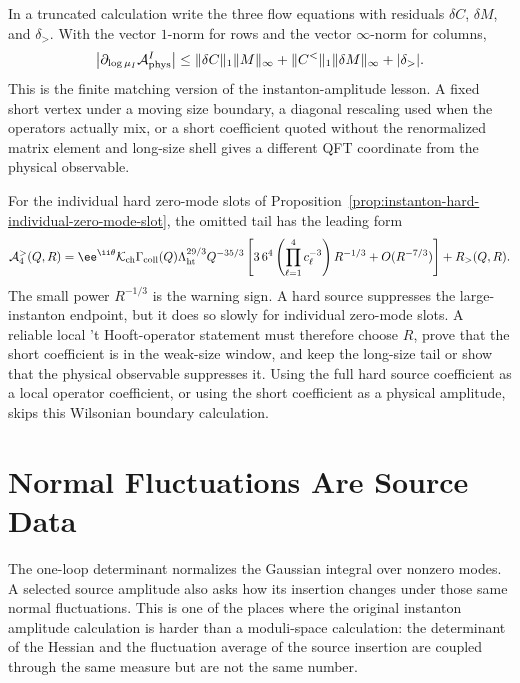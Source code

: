 \begin{controlledapproximation}
In a truncated calculation write the three flow equations with residuals
\(\delta C\), \(\delta M\), and \(\delta_>\).  With the vector \(1\)-norm for
rows and the vector \(\infty\)-norm for columns,
\begin{equation}
  \left|
  \partial_{\log\mu_I}\mathcal A_{\rm phys}^{I}
  \right|
  \le
  \|\delta C\|_1\|M\|_{\infty}
  +
  \|C^{<}\|_1\|\delta M\|_{\infty}
  +
  |\delta_>| .
  \label{eq:instanton-wilsonian-covariance-residual-bound}
\end{equation}
This is the finite matching version of the instanton-amplitude lesson.  A
fixed short vertex under a moving size boundary, a diagonal rescaling used
when the operators actually mix, or a short coefficient quoted without the
renormalized matrix element and long-size shell gives a different QFT
coordinate from the physical observable.
\end{controlledapproximation}

For the individual hard zero-mode slots of
Proposition~\ref{prop:instanton-hard-individual-zero-mode-slot}, the omitted
tail has the leading form
\begin{equation}
  \mathcal A_{4}^{>}(Q,R)
  =
  \ee^{\ii\theta}
  \mathcal K_{\rm ch}
  \Gamma_{\rm coll}(Q)
  \Lambda_{\rm ht}^{29/3}
  Q^{-35/3}
  \left[
    3\,6^4
    \left(\prod_{\ell=1}^{4}c_\ell^{-3}\right)R^{-1/3}
    +O(R^{-7/3})
  \right]
  +R_{>}(Q,R).
  \label{eq:instanton-hard-ope-long-tail}
\end{equation}
The small power \(R^{-1/3}\) is the warning sign.  A hard source suppresses the
large-instanton endpoint, but it does so slowly for individual zero-mode
slots.  A reliable local 't Hooft-operator statement must therefore choose
\(R\), prove that the short coefficient is in the weak-size window, and keep
the long-size tail or show that the physical observable suppresses it.  Using
the full hard source coefficient as a local operator coefficient, or using the
short coefficient as a physical amplitude, skips this Wilsonian boundary
calculation.

\section{Normal Fluctuations Are Source Data}
\label{sec:instanton-normal-fluctuation-source-data}

The one-loop determinant normalizes the Gaussian integral over nonzero modes.
A selected source amplitude also asks how its insertion changes under those
same normal fluctuations.  This is one of the places where the original
instanton amplitude calculation is harder than a moduli-space calculation:
the determinant of the Hessian and the fluctuation average of the source
insertion are coupled through the same measure but are not the same number.

